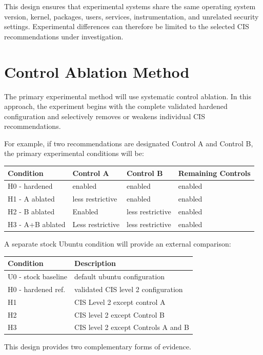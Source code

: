 \documentclass[11pt]{article}
\begin{document}
This design ensures that experimental systems share the same operating
system version, kernel, packages, users, services, instrumentation, and
unrelated security settings. Experimental differences can therefore be
limited to the selected CIS recommendations under investigation.
\section{Control Ablation Method}
\label{sec:orgcad0164}
The primary experimental method will use systematic control ablation. In
this approach, the experiment begins with the complete validated
hardened configuration and selectively removes or weakens individual CIS
recommendations.

For example, if two recommendations are designated Control A and Control
B, the primary experimental conditions will be:


\begin{center}
\begin{tabular}{llll}
Condition & Control A & Control B & Remaining Controls\\
\hline
H0 - hardened & enabled & enabled & enabled\\
H1 - A ablated & less restrictive & enabled & enabled\\
H2 - B ablated & Enabled & less restrictive & enabled\\
H3 - A+B ablated & Less restrictive & less restrictive & enabled\\
\end{tabular}
\end{center}


A separate stock Ubuntu condition will provide an external comparison:


\begin{center}
\begin{tabular}{ll}
Condition & Description\\
\hline
U0 - stock baseline & default ubuntu configuration\\
H0 - hardened ref. & validated CIS level 2 configuration\\
H1 & CIS Level 2 except control A\\
H2 & CIS level 2 except Control B\\
H3 & CIS level 2 except Controls A and B\\
\end{tabular}
\end{center}


This design provides two complementary forms of evidence.
\end{document}

